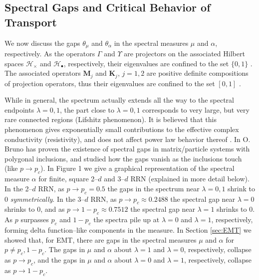 \documentclass[english,12pt,jmp,graphicx]{revtex4-1}
\begin{document}
\subsection{Spectral Gaps and Critical Behavior of
  Transport} \label{sec:Spectral_Gap}   
%
We now discuss the gaps $\theta_\mu$ and $\theta_\alpha$ in the spectral measures $\mu$
and $\alpha$, respectively. As
the operators $\Gamma$ and $\Upsilon$ are projectors on the associated Hilbert
spaces $\mathscr{H}_\times$ and $\mathscr{H}_\bullet$, 
respectively, their eigenvalues are confined to the set $\{0,1\}$
\cite{Reed-1980}. The associated operators $\mathbf{M}_j$ and $\mathbf{K}_j$,
$j=1,2$ are positive definite compositions of projection operators,
thus their eigenvalues are confined to the set $[0,1]$
\cite{Golden:CMP-467}. 

While in general, the spectrum actually extends all the way to the
spectral endpoints $\lambda=0,1$, the part close to $\lambda=0,1$ corresponds to
very large, but very rare connected regions (Lifshitz phenomenon). It
is believed that this phenomenon gives exponentially small
contributions to the effective complex conductivity (resistivity), and
does not affect power law behavior thereof \cite{Golden:PRL-3935}. 
In \cite{Bruno:PRSLA-353} O. Bruno has proven the existence of
spectral gaps in matrix/particle systems with polygonal inclusions,
and studied how the gaps vanish as the inclusions touch (like
$p\to p_c$). In Figure 1 we give a graphical
representation of the spectral measure $\alpha$ for finite, square 2--$d$ and
3--$d$ RRN \cite{Golden:JoB:337} (explained in more detail below). In
the 2--$d$ RRN, as $p\to p_c=0.5$ the 
gaps in the spectrum near $\lambda=0,1$ shrink to 0 \emph{symmetrically}. In
the 3--$d$ RRN, as $p\to p_c\approx0.2488$ the spectral gap near $\lambda=0$ shrinks to
0, and as $p\to1-p_c\approx0.7512$ the spectral gap near $\lambda=1$ shrinks to 0.
As $p$ surpasses $p_c$ and $1-p_c$ the spectra pile up at $\lambda=0$ and
$\lambda=1$, respectively, forming delta function--like components in the
measure. In Section \ref{sec:EMT} we showed that, for EMT, there are
gaps in the spectral measures $\mu$ and $\alpha$ for $p\neq p_c,1-p_c$. The gaps
in $\mu$ and $\alpha$ about $\lambda=1$ and $\lambda=0$, respectively, collapse as
$p\to p_c$, and the gaps in $\mu$ and $\alpha$ about $\lambda=0$ and $\lambda=1$,
respectively, collapse as $p\to1-p_c$.
\end{document}
